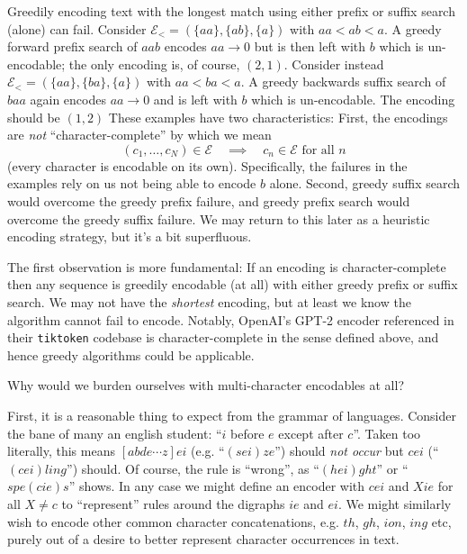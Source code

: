 \documentclass[11pt, oneside]{amsart}   	%
\begin{document}
Greedily encoding text with the longest match using either prefix or suffix search (alone) can fail. Consider $\mathcal{E}_{<} = (\{aa\},\{ab\},\{a\})$ with $aa < ab < a$. A greedy forward prefix search of $aab$ encodes $aa \to 0$ but is then left with $b$ which is un-encodable; the only encoding is, of course, $(2,1)$. Consider instead $\mathcal{E}_{<} = (\{aa\},\{ba\},\{a\})$ with $aa < ba < a$. A greedy backwards suffix search of $baa$ again encodes $aa \to 0$ and is left with $b$ which is un-encodable. The encoding should be $(1,2)$ These examples have two characteristics: First, the encodings are {\em not} ``character-complete'' by which we mean 
\begin{equation*}
	(c_1, \dotsc, c_N) \in \mathcal{E} \quad\implies\quad c_n \in \mathcal{E} \text{ for all } n
\end{equation*}
(every character is encodable on its own). Specifically, the failures in the examples rely on us not being able to encode $b$ alone. Second, greedy suffix search would overcome the greedy prefix failure, and greedy prefix search would overcome the greedy suffix failure. We may return to this later as a heuristic encoding strategy, but it's a bit superfluous. 

The first observation is more fundamental: If an encoding is character-complete then any sequence is greedily encodable (at all) with either greedy prefix or suffix search. We may not have the {\em shortest} encoding, but at least we know the algorithm cannot fail to encode. Notably, OpenAI's GPT-2 encoder referenced in their \texttt{tiktoken} codebase is character-complete in the sense defined above, and hence greedy algorithms could be applicable. 

Why would we burden ourselves with multi-character encodables at all? 

First, it is a reasonable thing to expect from the grammar of languages. Consider the bane of many an english student: ``$i$ before $e$ except after $c$''. Taken too literally, this means $[abde \dotsb z]ei$ (e.g. ``$(sei)ze$'') should {\em not occur} but $cei$ (``$(cei)ling$'') should. Of course, the rule is ``wrong'', as ``$(hei)ght$'' or ``$spe(cie)s$'' shows. In any case we might define an encoder with $cei$ and $Xie$ for all $X \neq c$ to ``represent'' rules around the digraphs $ie$ and $ei$. We might similarly wish to encode other common character concatenations, e.g. $th$, $gh$, $ion$, $ing$ etc, purely out of a desire to better represent character occurrences in text. 
\end{document}
